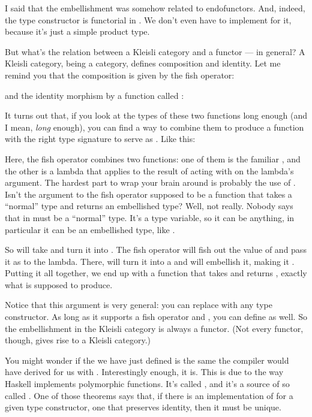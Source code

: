 I said that the embellishment was somehow related to endofunctors. And,
indeed, the  type constructor is functorial in
. We don't even have to implement  for it,
because it's just a simple product type.

But what's the relation between a Kleisli category and a functor --- in
general? A Kleisli category, being a category, defines composition and
identity. Let me remind you that the composition is given by the fish
operator:

and the identity morphism by a function called :

It turns out that, if you look at the types of these two functions long
enough (and I mean, \emph{long} enough), you can find a way to combine
them to produce a function with the right type signature to serve as
. Like this:

Here, the fish operator combines two functions: one of them is the
familiar , and the other is a lambda that applies
 to the result of acting with  on the lambda's
argument. The hardest part to wrap your brain around is probably the use
of . Isn't the argument to the fish operator supposed to be a
function that takes a ``normal'' type and returns an embellished type?
Well, not really. Nobody says that  in
 must be a ``normal'' type. It's a
type variable, so it can be anything, in particular it can be an
embellished type, like .

So  will take  and turn it into
. The fish operator will fish out the value of
 and pass it as  to the lambda. There, 
will turn it into a  and  will embellish it,
making it . Putting it all together, we end up with a
function that takes  and returns ,
exactly what  is supposed to produce.

Notice that this argument is very general: you can replace
 with any type constructor. As long as it supports a fish
operator and , you can define  as well. So
the embellishment in the Kleisli category is always a functor. (Not
every functor, though, gives rise to a Kleisli category.)

You might wonder if the  we have just defined is the same
 the compiler would have derived for us with
. Interestingly enough, it is. This is due to
the way Haskell implements polymorphic functions. It's called
, and it's a source of so called
. One of those theorems says that, if there is
an implementation of  for a given type constructor, one
that preserves identity, then it must be unique.

